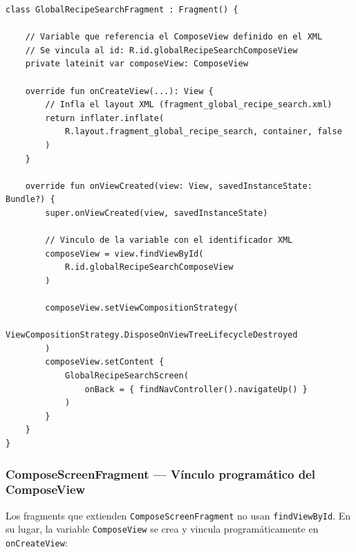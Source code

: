 \documentclass[stu, 12pt, letterpaper, donotrepeattitle, floatsintext, natbib]{apa7}
\begin{document}
\begin{lstlisting}[caption={Vínculo XML tradicional en GlobalRecipeSearchFragment.kt}]
class GlobalRecipeSearchFragment : Fragment() {

    // Variable que referencia el ComposeView definido en el XML
    // Se vincula al id: R.id.globalRecipeSearchComposeView
    private lateinit var composeView: ComposeView

    override fun onCreateView(...): View {
        // Infla el layout XML (fragment_global_recipe_search.xml)
        return inflater.inflate(
            R.layout.fragment_global_recipe_search, container, false
        )
    }

    override fun onViewCreated(view: View, savedInstanceState: Bundle?) {
        super.onViewCreated(view, savedInstanceState)

        // Vinculo de la variable con el identificador XML
        composeView = view.findViewById(
            R.id.globalRecipeSearchComposeView
        )

        composeView.setViewCompositionStrategy(
            ViewCompositionStrategy.DisposeOnViewTreeLifecycleDestroyed
        )
        composeView.setContent {
            GlobalRecipeSearchScreen(
                onBack = { findNavController().navigateUp() }
            )
        }
    }
}
\end{lstlisting}

\subsubsection{ComposeScreenFragment --- Vínculo programático del ComposeView}

Los fragments que extienden \texttt{ComposeScreenFragment} no usan
\texttt{findViewById}. En su lugar, la variable \texttt{ComposeView} se crea y vincula
programáticamente en \texttt{onCreateView}:
\end{document}
